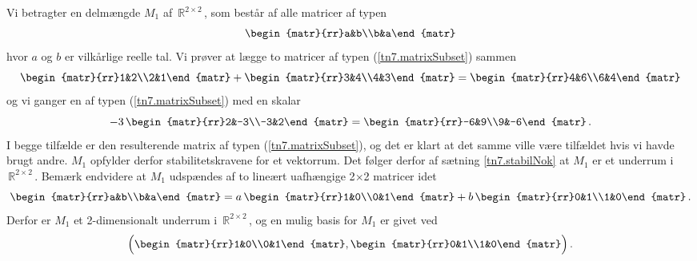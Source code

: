 \begin{example}
Vi betragter en delmængde $M_1$ af $\,\mathbb R^{2\times 2}\,$, som består af alle matricer af typen
\begin{equation}\label{tn7.matrixSubset}
\begin{matr}{rr}a&b\\b&a\end{matr}
\end{equation}
hvor $a$ og $b$ er vilkårlige reelle tal. Vi prøver at lægge to matricer af typen (\ref{tn7.matrixSubset}) sammen
$$
\begin{matr}{rr}1&2\\2&1\end{matr}+\begin{matr}{rr}3&4\\4&3\end{matr}=\begin{matr}{rr}4&6\\6&4\end{matr}
$$
og vi ganger en af typen (\ref{tn7.matrixSubset}) med en skalar
$$ 
-3\,\begin{matr}{rr}2&-3\\-3&2\end{matr}=\begin{matr}{rr}-6&9\\9&-6\end{matr}\,.
$$
I begge tilfælde er den resulterende matrix af typen (\ref{tn7.matrixSubset}), og det er klart at det samme ville være tilfældet hvis vi havde brugt andre. $M_1$ opfylder derfor stabilitetskravene for et vektorrum. Det følger derfor af sætning \ref{tn7.stabilNok} at $M_1$ er et underrum i $\,\mathbb R^{2\times 2}\,$. \bs
Bemærk endvidere at $M_1$ udspændes af to lineært uafhængige 2$\times$2 matricer idet
$$
\begin{matr}{rr}a&b\\b&a\end{matr}=a\,\begin{matr}{rr}1&0\\0&1\end{matr}+b\,\begin{matr}{rr}0&1\\1&0\end{matr}\,.
$$
Derfor er $M_1$ et 2-dimensionalt underrum i $\,\mathbb R^{2\times 2}\,$, og en mulig basis for $M_1$ er givet ved
$$\Big (\begin{matr}{rr}1&0\\0&1\end{matr},\begin{matr}{rr}0&1\\1&0\end{matr}\Big )\,.
$$ 
\end{example}

